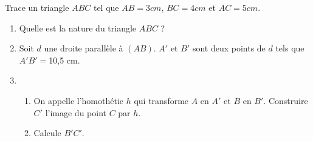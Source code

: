 
Trace un triangle $ABC$ tel que $AB = 3 cm$, $BC = 4 cm$ et $AC = 5 cm$.
\begin{enumerate}
\item Quelle est la nature du triangle $ABC$ ?
\item Soit $d$ une droite parallèle à $(AB)$. $A'$ et $B'$ sont deux points de $d$ tels que $A'B' = $10,5 cm.
\item 
\begin{enumerate}
\item On appelle l'homothétie $h$ qui transforme $A$ en $A'$ et $B$ en $B'$. Construire $C'$ l'image du point $C$ par $h$.
\item Calcule $B'C'$.
\end{enumerate}
\end{enumerate}
